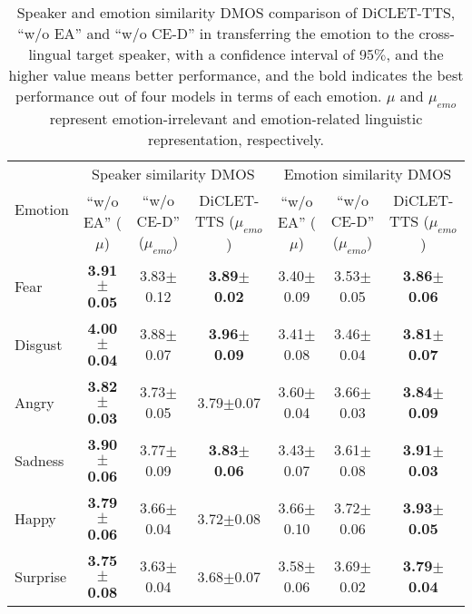 \documentclass[journal,comsoc]{IEEEtran}
\begin{document}
\begin{table*}[h]
 \caption{Speaker and emotion similarity DMOS comparison of DiCLET-TTS, ``w/o EA'' and ``w/o CE-D'' in transferring the emotion to the cross-lingual target speaker, with a confidence interval of 95$\%$, and the higher value means better performance, and the bold indicates the best performance out of four models in terms of each emotion.
 $\mu$ and $\mu_{emo}$ represent emotion-irrelevant and emotion-related linguistic representation, respectively.}
 \label{tab:abemospk}
\setlength{\tabcolsep}{3mm}
 \centering
\begin{tabular}{l|ccc|ccc}
\toprule 
\multicolumn{1}{c|}{\multirow{2}{*}{Emotion}} & \multicolumn{3}{c|}{Speaker similarity DMOS}   & \multicolumn{3}{c}{Emotion similarity DMOS}                                                \\ \cmidrule{2-7} 
\multicolumn{1}{c|}{}    & \multicolumn{1}{c}{``w/o EA'' ($\mu$)} & \multicolumn{1}{c}{``w/o CE-D''  ($\mu_{emo}$)} & \multicolumn{1}{c|}{DiCLET-TTS ($\mu_{emo}$)} 
                        & \multicolumn{1}{c}{``w/o EA'' ($\mu$)} & \multicolumn{1}{c}{``w/o CE-D''  ($\mu_{emo}$)} & \multicolumn{1}{c}{DiCLET-TTS ($\mu_{emo}$)} \\ \midrule
Fear             &\bf{3.91}$\pm$0.05  &3.83$\pm$0.12   &\bf{3.89}$\pm$0.02      &3.40$\pm$0.09  &3.53$\pm$0.05  &\bf{3.86}$\pm$0.06  \\
Disgust          &\bf{4.00}$\pm$0.04  &3.88$\pm$0.07   &\bf{3.96}$\pm$0.09      &3.41$\pm$0.08  &3.46$\pm$0.04  &\bf{3.81}$\pm$0.07   \\ 
Angry            &\bf{3.82}$\pm$0.03  &3.73$\pm$0.05   &3.79$\pm$0.07           &3.60$\pm$0.04  &3.66$\pm$0.03  &\bf{3.84}$\pm$0.09   \\
Sadness          &\bf{3.90}$\pm$0.06  &3.77$\pm$0.09   &\bf{3.83}$\pm$0.06      &3.43$\pm$0.07  &3.61$\pm$0.08  &\bf{3.91}$\pm$0.03  \\
Happy            &\bf{3.79}$\pm$0.06  &3.66$\pm$0.04   &3.72$\pm$0.08           &3.66$\pm$0.10  &3.72$\pm$0.06  &\bf{3.93}$\pm$0.05   \\
Surprise         &\bf{3.75}$\pm$0.08  &3.63$\pm$0.04   &3.68$\pm$0.07           &3.58$\pm$0.06  &3.69$\pm$0.02  &\bf{3.79}$\pm$0.04   \\ \bottomrule
\end{tabular}
\end{table*}

\vspace{-0.2cm}
\end{document}
